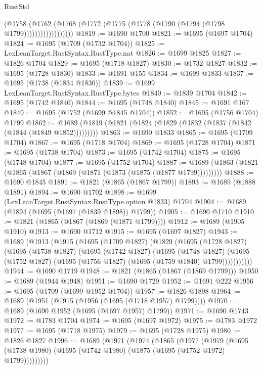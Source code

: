 \begin{lexlean}{RustStd}
\begin{coremodule}
{\begin{coremodule}
{{{{{{{{{{{{{{{{                      (@1758
                        (@1762
                          (@1768 (@1772 (@1775 (@1778 (@1790 (@1794 (@1798 @1799))))))))))))))))))
@1819 := @1690 @1700
@1821 := @1695 (@1697 @1704)
@1824 := @1695 (@1709 (@1732 @1704))
@1825 := LexLeanTarget.RustSyntax.RustType.nat
@1826 := @1699 @1825
@1827 := @1826 @1704
@1829 := @1695 (@1718 @1827)
@1830 := @1732 @1827
@1832 := @1695 (@1728 @1830)
@1833 := @1691 @155
@1834 := @1699 @1833
@1837 := @1695 (@1738 (@1834 @1830))
@1839 := @1699 LexLeanTarget.RustSyntax.RustType.bytes
@1840 := @1839 @1704
@1842 := @1695 (@1742 @1840)
@1844 := @1695 (@1748 @1840)
@1845 := @1691 @167
@1849 := @1695 (@1752 (@1699 @1845 @1704))
@1852 := @1695 (@1756 @1704) @1799
@1862 := @1689 (@1819 (@1821 (@1824 (@1829 (@1832 (@1837 (@1842 (@1844 (@1849 @1852)))))))))
@1863 := @1690 @1833
@1865 := @1695 (@1709 @1704)
@1867 := @1695 (@1718 @1704)
@1869 := @1695 (@1728 @1704)
@1871 := @1695 (@1738 @1704)
@1873 := @1695 (@1742 @1704)
@1875 := @1695 (@1748 @1704)
@1877 := @1695 (@1752 @1704)
@1887 := @1689 (@1863 (@1821 (@1865 (@1867 (@1869 (@1871 (@1873 (@1875 (@1877 @1799)))))))))
@1888 := @1690 @1845
@1891 := @1821 (@1865 (@1867 @1799))
@1893 := @1689 (@1888 @1891)
@1894 := @1690 @1702
@1898 := @1699 (LexLeanTarget.RustSyntax.RustType.option @1833) @1704
@1904 := @1689 (@1894 (@1695 (@1697 (@1839 @1898)) @1799))
@1905 := @1690 @1710
@1910 := @1821 (@1865 (@1867 (@1869 (@1871 @1799))))
@1912 := @1689 (@1905 @1910)
@1913 := @1690 @1712
@1915 := @1695 (@1697 @1827)
@1943 := @1689
    (@1913
      (@1915
        (@1695
          (@1709 @1827)
          (@1829
            (@1695
              (@1728 @1827)
              (@1695
                (@1738 @1827)
                (@1695
                  (@1742 @1827)
                  (@1695
                    (@1748 @1827)
                    (@1695 (@1752 @1827) (@1695 (@1756 @1827) (@1695 (@1759 @1840) @1799)))))))))))
@1944 := @1690 @1719
@1948 := @1821 (@1865 (@1867 (@1869 @1799)))
@1950 := @1689 (@1944 @1948)
@1951 := @1690 @1729
@1952 := @1691 @222
@1956 := @1695 (@1709 (@1699 @1952 @1704))
@1957 := @1826 @1898
@1964 := @1689 (@1951 (@1915 (@1956 (@1695 (@1718 @1957) @1799))))
@1970 := @1689 (@1690 @1952 (@1695 (@1697 @1957) @1799))
@1971 := @1690 @1743
@1972 := @1783 @1704
@1974 := @1695 (@1697 @1972)
@1975 := @1783 @1972
@1977 := @1695 (@1718 @1975)
@1979 := @1695 (@1728 @1975)
@1980 := @1826 @1827
@1996 := @1689
    (@1971
      (@1974
        (@1865
          (@1977
            (@1979
              (@1695 (@1738 @1980) (@1695 (@1742 @1980) (@1875 (@1695 (@1752 @1972) @1799)))))))))
}}}}}}}}}}}}}}}}
\end{coremodule}}
\end{coremodule}
\end{lexlean}
